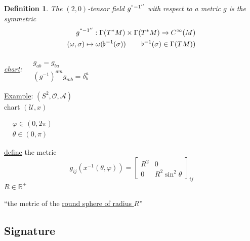 \documentclass[10pt]{amsart}
\newtheorem{definition}{Definition}
\begin{document}
\begin{multicols*}{2}
	\begin{definition}
		The $(2,0)$-tensor field $g^{``-1''}$ with respect to a metric $g$ is the symmetric
		\[
		\begin{aligned}
		g^{``-1''} : \Gamma(T^*M) \times \Gamma(T^*M) \xrightarrow{ ~ } C^{\infty}(M) \\
		(\omega, \sigma) \mapsto \omega( \flat^{-1}(\sigma)) \quad \quad \, \flat^{-1}(\sigma) \in \Gamma(TM))
		\end{aligned}
		\]
		
		\underline{chart}: $\begin{aligned} & \quad \\ 
		& g_{ab} = g_{ba} \\
		& (g^{-1})^{am} g_{mb} = \delta^a_b \end{aligned}$
		
		
	\end{definition}
	
	\underline{Example}: $(S^2, \mathcal{O}, \mathcal{A})$ \\ 
	\phantom{example } chart $(\mathcal{U}, x)$
	
	$\begin{aligned} 
	& \varphi \in (0,2\pi ) \\ 
	& \theta \in (0,\pi)\end{aligned}$
	
	\underline{define} the metric
	\[
	g_{ij}(x^{-1}(\theta,\varphi)) = \left[ \begin{matrix} R^2 & 0 \\
	0 & R^2\sin^2{\theta} \end{matrix} \right]_{ij}
	\]
	$R \in \mathbb{R}^+$
	
	``the metric of the \underline{round sphere of radius $R$}''
	
	\subsection{Signature} 
	

\end{multicols*}
\end{document}
